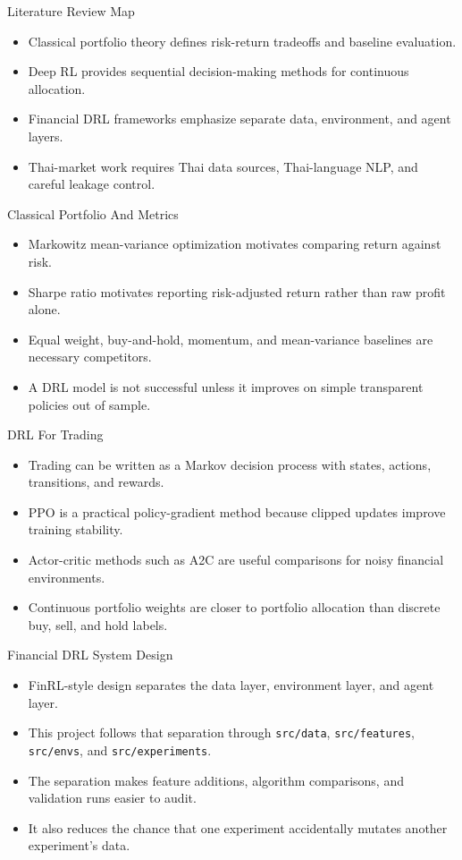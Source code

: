 \documentclass[aspectratio=43,10pt]{beamer}
\begin{document}
\begin{frame}{Literature Review Map}
\begin{itemize}
  \item Classical portfolio theory defines risk-return tradeoffs and baseline evaluation.
  \item Deep RL provides sequential decision-making methods for continuous allocation.
  \item Financial DRL frameworks emphasize separate data, environment, and agent layers.
  \item Thai-market work requires Thai data sources, Thai-language NLP, and careful leakage control.
\end{itemize}
\end{frame}

\begin{frame}{Classical Portfolio And Metrics}
\begin{itemize}
  \item Markowitz mean-variance optimization motivates comparing return against risk.
  \item Sharpe ratio motivates reporting risk-adjusted return rather than raw profit alone.
  \item Equal weight, buy-and-hold, momentum, and mean-variance baselines are necessary competitors.
  \item A DRL model is not successful unless it improves on simple transparent policies out of sample.
\end{itemize}
\end{frame}

\begin{frame}{DRL For Trading}
\begin{itemize}
  \item Trading can be written as a Markov decision process with states, actions, transitions, and rewards.
  \item PPO is a practical policy-gradient method because clipped updates improve training stability.
  \item Actor-critic methods such as A2C are useful comparisons for noisy financial environments.
  \item Continuous portfolio weights are closer to portfolio allocation than discrete buy, sell, and hold labels.
\end{itemize}
\end{frame}

\begin{frame}{Financial DRL System Design}
\begin{itemize}
  \item FinRL-style design separates the data layer, environment layer, and agent layer.
  \item This project follows that separation through \texttt{src/data}, \texttt{src/features}, \texttt{src/envs}, and \texttt{src/experiments}.
  \item The separation makes feature additions, algorithm comparisons, and validation runs easier to audit.
  \item It also reduces the chance that one experiment accidentally mutates another experiment's data.
\end{itemize}
\end{frame}
\end{document}
